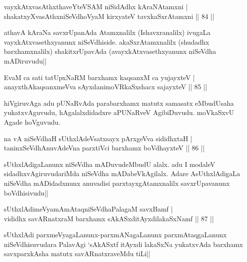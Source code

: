 \begin{shl}
vayxkAtxvasAthx\s thaveYteVSAM niSidAdhx kAraNAtamxni |\\
shakatxyXvasAthxniSeVdhoV\s yaM kirxyateV tavxkaSxrAtamxni \hfill || 84 ||
\end{shl}

\begin{artha}
athavA kAraNa savxrUpanAda Atamxnalilx (Ishavxranalilx) ivugaLa vayxkAtxvasethxyanunx niSeVdhiside. akaSxrAtamxnalilx (shudadhx barxhamxnalilx) shakitxrUpavAda (avayxkAtxvasethxyanunx niSeVdha mADiruvudu||
\end{artha}


\begin{shl}
EvaM ca sati tatUpxNaRM barxhamx kaqsanxM ca yujayxteV |\\
anayxthA\s kaqsanxmeVva sAyxdanimoVRkaSxshacx sajayxteV \hfill || 85 ||
\end{shl}

\begin{artha}
hiVgiruvAga adu pUNaRvAda parabarxhamx matutx samasatx eMbudUsaha yukatxvAguvudu, hAgalalxdidadxre aPUNaRveV AgibiDuvudu. moVkaSxvU Agade hoVguvudu. 
\end{artha}


\begin{shl}
na vA niSeVdhaH sUthxlAdeVsatxsayx pArxgeVva sididhxtaH |\\
taninxSeVdhAnuvAdeVna parxtiVci barxhamx boVdhayxteV \hfill || 86 ||
\end{shl}

\begin{artha}
sUthxlAdigaLanunx niSeVdha mADuvudeMbudU alalx. adu I modaleV sidadhxvAgiruvudariMda niSeVdha mADabeVkAgilalx. Adare AsUthxlAdigaLa niSeVdha mADidadxnunx anuvadisi parxtayxgAtamxnalilx savxrUpavanunx boVdhisivudu||
\end{artha}

\begin{shl}
sUthxlAdimeVyamAmAtaqniSeVdhaPalagaM savxBamf |\\
vididhx savARnatxraM barxhamx sAkASxditAyxdilakaSxNamf \hfill || 87 ||
\end{shl}

\begin{artha}
sUthxlAdi parxmeVyagaLanunx-parxmANagaLanunx parxmAtaqgaLanunx niSeVdhisuvudara PalavAgi `sAkASxtf itAyxdi lakaSxNa yukatxvAda barxhamx savxparxkAsha matutx savARnatxraveMdu tiLi||
\end{artha}

